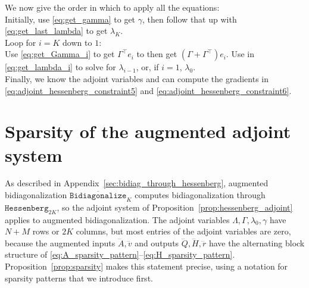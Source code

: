 \documentclass[a4paper,12pt]{article}
\theoremstyle{definition}
\begin{document}
We now give the order in which to apply all the equations: 
\\
Initially, use \eqref{eq:get_gamma} to get $\gamma$, then follow that up with \eqref{eq:get_last_lambda} to get $\lambda_K$. 
\\Loop for $i = K$ down to $1$:
\\
Use \eqref{eq:get_Gamma_i} to get $\Gamma^\top e_i$ to then get $(\Gamma + \Gamma^\top)e_i$. Use in \eqref{eq:get_lambda_i} to solve for $\lambda_{i-1}$, or, if $i=1$, $\lambda_0$.
\\ Finally, we know the adjoint variables and can compute the gradients in \eqref{eq:adjoint_hessenberg_constraint5} and \eqref{eq:adjoint_hessenberg_constraint6}.

\section{Sparsity of the augmented adjoint system}\label{app:sparsity_proofs}\label{subsec:derivation_stable_adjoint_system}
As described in Appendix~\ref{sec:bidiag_through_hessenberg}, augmented bidiagonalization $\overline{\texttt{Bidiagonalize}}_K$ computes bidiagonalization through $\texttt{Hessenberg}_{2K}$, so the adjoint system of Proposition~\ref{prop:hessenberg_adjoint} applies to augmented bidiagonalization. The adjoint variables $\Lambda, \Gamma, \lambda_0, \gamma$ have $N + M$ rows or $2K$ columns, but most entries of the adjoint variables are zero, because the augmented inputs $\dddot{A}, \dddot{v}$ and outputs $\dddot{Q}, \dddot{H}, \dddot{r}$ have the alternating block structure of \eqref{eq:A_sparsity_pattern}--\eqref{eq:H_sparsity_pattern}. Proposition~\ref{prop:sparsity} makes this statement precise, using a notation for sparsity patterns that we introduce first.
\end{document}
